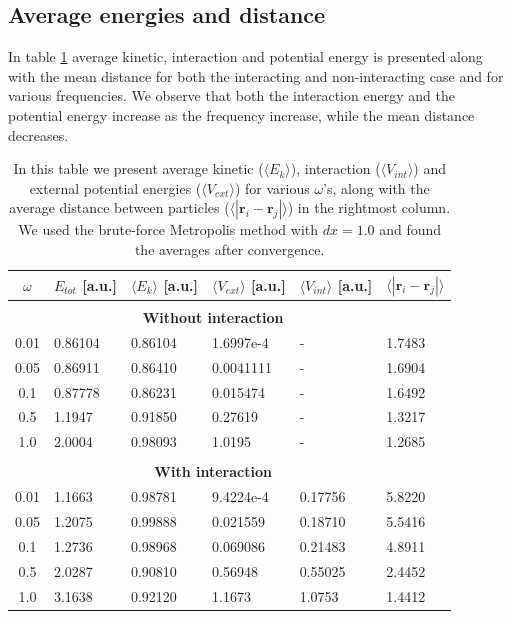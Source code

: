 \documentclass[norsk,a4paper,12pt]{article}
\begin{document}
\subsection{Average energies and distance}
In table \ref{tab:average_energies} average kinetic, interaction and potential energy is presented along with the mean distance for both the interacting and non-interacting case and for various frequencies. We observe that both the interaction energy and the potential energy increase as the frequency increase, while the mean distance decreases.

\begin{table} [H]
	\caption{In this table we present average kinetic ($\langle E_k\rangle$), interaction ($\langle V_{int}\rangle$) and external potential energies ($\langle V_{ext}\rangle$) for various $\omega$'s, along with the average distance between particles ($\langle |\boldsymbol{r}_i-\boldsymbol{r}_j|\rangle$) in the rightmost column. We used the brute-force Metropolis method with $dx=1.0$ and found the averages after convergence.  \vspace{2mm}}
	\begin{tabularx}{\textwidth}{c|XXXXX} \hline\hline
		\label{tab:average_energies}
		$\omega$ & $ E_{tot}$ [a.u.] & $\langle E_k\rangle$ [a.u.] & $\langle V_{ext}\rangle$ [a.u.] & $\langle V_{int}\rangle$ [a.u.] & $\langle |\boldsymbol{r}_i-\boldsymbol{r}_j|\rangle$ \\ \hline \\
				& \multicolumn{4}{c}{\textbf{Without interaction}}\\ \hline
				0.01 & 0.86104 & 0.86104 & 1.6997e-4 & - & 1.7483 \\
				0.05 & 0.86911 & 0.86410 & 0.0041111 & - & 1.6904 \\
				0.1 & 0.87778 & 0.86231 & 0.015474 & - & 1.6492 \\
				0.5 & 1.1947 & 0.91850 & 0.27619 & - & 1.3217 \\
				1.0 & 2.0004 & 0.98093 & 1.0195 & - & 1.2685 \\ \hline \\
		& \multicolumn{4}{c}{\textbf{With interaction}}\\ \hline
				0.01 & 1.1663 & 0.98781 & 9.4224e-4 & 0.17756 & 5.8220 \\
				0.05 & 1.2075 & 0.99888 & 0.021559 & 0.18710 & 5.5416 \\
				0.1 & 1.2736 & 0.98968 & 0.069086 & 0.21483 & 4.8911 \\
				0.5 & 2.0287 & 0.90810 & 0.56948 & 0.55025 & 2.4452 \\
				1.0 & 3.1638 & 0.92120 & 1.1673 & 1.0753 & 1.4412 \\ \hline
	\end{tabularx}
\end{table}
\end{document}
